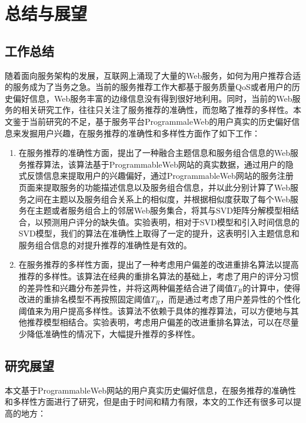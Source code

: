 \documentclass[master,winfonts]{njuthesis}
\begin{document}

\chapter{总结与展望}\label{5}
\section{工作总结}
随着面向服务架构的发展，互联网上涌现了大量的Web服务，如何为用户推荐合适的服务成为了当务之急。当前的服务推荐工作大都基于服务质量QoS或者用户的历史偏好信息，Web服务丰富的边缘信息没有得到很好地利用。同时，当前的Web服务的相关研究工作，往往只关注了服务推荐的准确性，而忽略了推荐的多样性。本文鉴于当前研究的不足，基于服务平台ProgrammaleWeb的用户真实的历史偏好信息来发掘用户兴趣，在服务推荐的准确性和多样性方面作了如下工作：

\begin{enumerate}
\item 在服务推荐的准确性方面，提出了一种融合主题信息和服务组合信息的Web服务推荐算法，该算法基于ProgrammableWeb网站的真实数据，通过用户的隐式反馈信息来提取用户的兴趣偏好，通过ProgrammableWeb网站的服务注册页面来提取服务的功能描述信息以及服务组合信息，并以此分别计算了Web服务之间在主题以及服务组合关系上的相似度，并根据相似度获取了每个Web服务在主题或者服务组合上的邻居Web服务集合，将其与SVD矩阵分解模型相结合，以预测用户评分的缺失值。实验表明，相对于SVD模型和引入时间信息的SVD模型，我们的算法在准确性上取得了一定的提升，这表明引入主题信息和服务组合信息的对提升推荐的准确性是有效的。

\item 在服务推荐的多样性方面，提出了一种考虑用户偏差的改进重排名算法以提高推荐的多样性。该算法在经典的重排名算法的基础上，考虑了用户的评分习惯的差异性和兴趣分布差异性，并将这两种偏差结合进了阈值$T_R$的计算中，使得改进的重排名模型不再按照固定阈值$T_R$，而是通过考虑了用户差异性的个性化阈值来为用户提高多样性。该算法不依赖于具体的推荐算法，可以方便地与其他推荐模型相结合。实验表明，考虑用户偏差的改进重排名算法，可以在尽量少降低准确性的情况下，大幅提升推荐的多样性。
\end{enumerate}

\section{研究展望}
本文基于ProgrammableWeb网站的用户真实历史偏好信息，在服务推荐的准确性和多样性方面进行了研究，但是由于时间和精力有限，本文的工作还有很多可以提高的地方：
\end{document}
